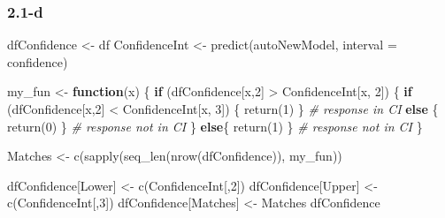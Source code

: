 \documentclass[
]{article}
\newenvironment{Shaded}{\begin{snugshade}}{\end{snugshade}}
\newcommand{\AttributeTok}[1]{\textcolor[rgb]{0.77,0.63,0.00}{#1}}
\newcommand{\CommentTok}[1]{\textcolor[rgb]{0.56,0.35,0.01}{\textit{#1}}}
\newcommand{\ControlFlowTok}[1]{\textcolor[rgb]{0.13,0.29,0.53}{\textbf{#1}}}
\newcommand{\DecValTok}[1]{\textcolor[rgb]{0.00,0.00,0.81}{#1}}
\newcommand{\FunctionTok}[1]{\textcolor[rgb]{0.00,0.00,0.00}{#1}}
\newcommand{\NormalTok}[1]{#1}
\newcommand{\OtherTok}[1]{\textcolor[rgb]{0.56,0.35,0.01}{#1}}
\newcommand{\SpecialCharTok}[1]{\textcolor[rgb]{0.00,0.00,0.00}{#1}}
\newcommand{\StringTok}[1]{\textcolor[rgb]{0.31,0.60,0.02}{#1}}
\begin{document}
\hypertarget{d}{%
\subsubsection{2.1-d}\label{d}}

\begin{Shaded}
\begin{Highlighting}[]
\NormalTok{dfConfidence }\OtherTok{\textless{}{-}}\NormalTok{ df}
\NormalTok{ConfidenceInt }\OtherTok{\textless{}{-}} \FunctionTok{predict}\NormalTok{(autoNewModel, }\AttributeTok{interval =} \StringTok{\textquotesingle{}confidence\textquotesingle{}}\NormalTok{)}

\NormalTok{my\_fun }\OtherTok{\textless{}{-}} \ControlFlowTok{function}\NormalTok{(x) \{}
  \ControlFlowTok{if}\NormalTok{ (dfConfidence[x,}\DecValTok{2}\NormalTok{] }\SpecialCharTok{\textgreater{}}\NormalTok{ ConfidenceInt[x, }\DecValTok{2}\NormalTok{]) \{}
    \ControlFlowTok{if}\NormalTok{ (dfConfidence[x,}\DecValTok{2}\NormalTok{] }\SpecialCharTok{\textless{}}\NormalTok{ ConfidenceInt[x, }\DecValTok{3}\NormalTok{]) \{}
      \FunctionTok{return}\NormalTok{(}\DecValTok{1}\NormalTok{)}
\NormalTok{    \} }\CommentTok{\# response in CI}
    \ControlFlowTok{else}\NormalTok{ \{}
      \FunctionTok{return}\NormalTok{(}\DecValTok{0}\NormalTok{)}
\NormalTok{    \} }\CommentTok{\# response not in CI}
\NormalTok{  \}}
  \ControlFlowTok{else}\NormalTok{\{}
    \FunctionTok{return}\NormalTok{(}\DecValTok{1}\NormalTok{)}
\NormalTok{  \} }\CommentTok{\# response not in CI}
\NormalTok{\}}

\NormalTok{Matches }\OtherTok{\textless{}{-}} \FunctionTok{c}\NormalTok{(}\FunctionTok{sapply}\NormalTok{(}\FunctionTok{seq\_len}\NormalTok{(}\FunctionTok{nrow}\NormalTok{(dfConfidence)), my\_fun))}

\NormalTok{dfConfidence[}\StringTok{\textquotesingle{}Lower\textquotesingle{}}\NormalTok{] }\OtherTok{\textless{}{-}} \FunctionTok{c}\NormalTok{(ConfidenceInt[,}\DecValTok{2}\NormalTok{])}
\NormalTok{dfConfidence[}\StringTok{\textquotesingle{}Upper\textquotesingle{}}\NormalTok{] }\OtherTok{\textless{}{-}} \FunctionTok{c}\NormalTok{(ConfidenceInt[,}\DecValTok{3}\NormalTok{])}
\NormalTok{dfConfidence[}\StringTok{\textquotesingle{}Matches\textquotesingle{}}\NormalTok{] }\OtherTok{\textless{}{-}}\NormalTok{ Matches}
\NormalTok{dfConfidence}
\end{Highlighting}
\end{Shaded}
\end{document}
